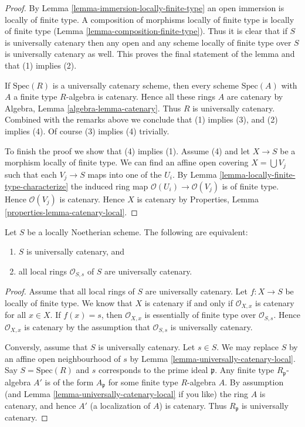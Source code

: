 \begin{proof}
By Lemma \ref{lemma-immersion-locally-finite-type} an open immersion
is locally of finite type. A composition of morphisms locally of
finite type is locally of finite type
(Lemma \ref{lemma-composition-finite-type}). Thus it is clear that if $S$ is
universally catenary then any open and any scheme locally of finite
type over $S$ is universally catenary as well. This proves the final
statement of the lemma and that (1) implies (2).

\medskip\noindent
If $\text{Spec}(R)$ is a universally catenary scheme, then every
scheme $\text{Spec}(A)$ with $A$ a finite type $R$-algebra is
catenary. Hence all these rings $A$ are catenary by
Algebra, Lemma \ref{algebra-lemma-catenary}.
Thus $R$ is universally catenary. Combined with the remarks above we
conclude that (1) implies (3), and (2) implies (4). Of course
(3) implies (4) trivially.

\medskip\noindent
To finish the proof we show that (4) implies (1).
Assume (4) and let $X \to S$ be a morphism locally of finite type.
We can find an affine open covering $X = \bigcup V_j$ such that
each $V_j \to S$ maps into one of the $U_i$. By
Lemma \ref{lemma-locally-finite-type-characterize}
the induced ring map $\mathcal{O}(U_i) \to \mathcal{O}(V_j)$ is
of finite type. Hence $\mathcal{O}(V_j)$ is catenary. Hence
$X$ is catenary by Properties, Lemma \ref{properties-lemma-catenary-local}.
\end{proof}

\begin{lemma}
\label{lemma-universally-catenary-local-rings-universally-catenary}
Let $S$ be a locally Noetherian scheme.
The following are equivalent:
\begin{enumerate}
\item $S$ is universally catenary, and
\item all local rings $\mathcal{O}_{S, s}$ of $S$ are universally catenary.
\end{enumerate}
\end{lemma}

\begin{proof}
Assume that all local rings of $S$ are universally catenary.
Let $f : X \to S$ be locally of finite type.
We know that $X$ is catenary if and only if $\mathcal{O}_{X, x}$ is
catenary for all $x \in X$. If $f(x) = s$, then $\mathcal{O}_{X, x}$
is essentially of finite type over $\mathcal{O}_{S, s}$. Hence
$\mathcal{O}_{X, x}$ is catenary by the assumption that
$\mathcal{O}_{S, s}$ is universally catenary.

\medskip\noindent
Conversly, assume that $S$ is universally catenary. Let $s \in S$.
We may replace $S$ by an affine open neighbourhood of $s$ by
Lemma \ref{lemma-universally-catenary-local}. Say $S = \text{Spec}(R)$
and $s$ corresponds to the prime ideal $\mathfrak p$. Any finite
type $R_{\mathfrak p}$-algebra $A'$ is of the form
$A_{\mathfrak p}$ for some finite type $R$-algebra $A$.
By assumption (and Lemma \ref{lemma-universally-catenary-local} if you like)
the ring $A$ is catenary, and hence $A'$ (a localization of $A$) is
catenary. Thus $R_{\mathfrak p}$ is universally catenary.
\end{proof}

